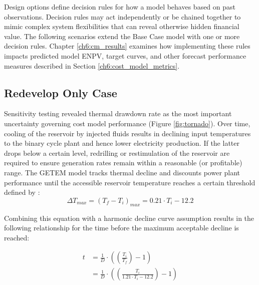 Design options define decision rules for how a model behaves based on past observations. Decision rules may act independently or be chained together to mimic complex system flexibilities that can reveal otherwise hidden financial value. The following scenarios extend the Base Case model with one or more decision rules. Chapter \ref{ch6:cm_results} examines how implementing these rules impacts predicted model ENPV, target curves, and other forecast performance measures described in Section \ref{ch6:cost_model_metrics}.

\subsection{Redevelop Only Case}\label{ch4:flex_redevelop_case}
Sensitivity testing revealed thermal drawdown rate as the most important uncertainty governing cost model performance (Figure \ref{fig:tornado}). Over time, cooling of the reservoir by injected fluids results in declining input temperatures to the binary cycle plant and hence lower electricity production. If the latter drops below a certain level, redrilling or restimulation of the reservoir are required to ensure generation rates remain within a reasonable (or profitable) range. The GETEM model tracks thermal decline and discounts power plant performance until the accessible reservoir temperature reaches a certain threshold defined by \citep{entingh_volume_2006}:
\begin{equation}
\label{eq:drawdown_threshold}
    \Delta T_{max} = (T_f-T_i)_{max} = 0.21 \cdot T_i - 12.2
\end{equation}

Combining this equation with a harmonic decline curve assumption results in the following relationship for the time before the maximum acceptable decline is reached:

\begin{equation}
\label{eq:redevelop_time}
\begin{aligned}
    t &= \frac{1}{D} \cdot 
    \left( {
    \left( {\frac{T_i}{T_f} }\right) - 1
    }\right)\\
    &= \frac{1}{D} \cdot 
    \left( {
    \left( {\frac{T_i}{1.21 \cdot T_i - 12.2}
    }\right) - 1
    }\right) 
\end{aligned}
\end{equation}

